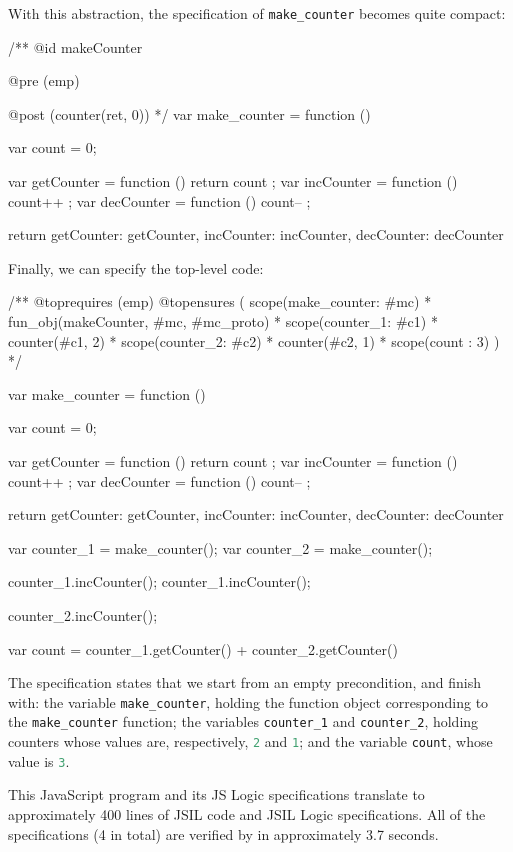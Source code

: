 \documentclass{llncs}
\def\jsinline{\lstinline[language=JavaScript, basicstyle=\small]}
\begin{document}
\medskip
With this abstraction, the specification of \jsinline|make_counter| becomes quite compact:

\medskip
\begin{lstjs}[firstnumber=1]
/**
  @id makeCounter

  @pre (emp)
  
  @post (counter(ret, 0))
*/
var make_counter = function () {
   var count = 0;

   var getCounter = function () { return count };
   var incCounter = function () { count++ };
   var decCounter = function () { count-- };

   return { getCounter: getCounter, incCounter: incCounter, decCounter: decCounter }
}
\end{lstjs}

\medskip
Finally, we can specify the top-level code:
\begin{lstjs}[firstnumber=1]
/**
 @toprequires (emp)
 @topensures (
   scope(make_counter: #mc) *
   fun_obj(makeCounter, #mc, #mc_proto) *
   scope(counter_1: #c1) * counter(#c1, 2) *
   scope(counter_2: #c2) * counter(#c2, 1) *
   scope(count : 3)
 )
*/

var make_counter = function () {
   var count = 0;

   var getCounter = function () { return count };
   var incCounter = function () { count++ };
   var decCounter = function () { count-- };

   return { getCounter: getCounter, incCounter: incCounter, decCounter: decCounter }
}

var counter_1 = make_counter();
var counter_2 = make_counter();

counter_1.incCounter();
counter_1.incCounter();

counter_2.incCounter();

var count = counter_1.getCounter() + counter_2.getCounter()
\end{lstjs}

The specification states that we start from an empty precondition, and finish with: the variable \jsinline|make_counter|, holding the function object corresponding to the \jsinline|make_counter| function; the variables \jsinline|counter_1| and \jsinline|counter_2|, holding counters whose values are, respectively, \jsinline|2| and \jsinline|1|; and the variable \jsinline|count|, whose value is \jsinline|3|.

This JavaScript program and its JS Logic specifications translate to approximately 400 lines of JSIL code and JSIL Logic specifications. All of the specifications (4 in total) are verified by \javert in approximately 3.7 seconds. 
\end{document}
